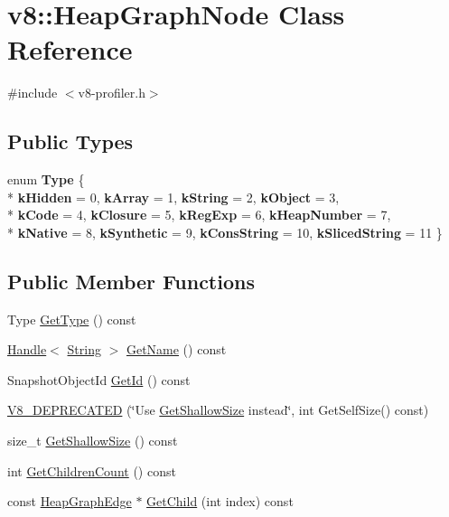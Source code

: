 \hypertarget{classv8_1_1HeapGraphNode}{\section{v8\-:\-:Heap\-Graph\-Node Class Reference}
\label{classv8_1_1HeapGraphNode}
}


{\ttfamily \#include $<$v8-\/profiler.\-h$>$}

\subsection*{Public Types}
\begin{DoxyCompactItemize}
\item 
enum {\bfseries Type} \{ \\*
{\bfseries k\-Hidden} =  0, 
{\bfseries k\-Array} =  1, 
{\bfseries k\-String} =  2, 
{\bfseries k\-Object} =  3, 
\\*
{\bfseries k\-Code} =  4, 
{\bfseries k\-Closure} =  5, 
{\bfseries k\-Reg\-Exp} =  6, 
{\bfseries k\-Heap\-Number} =  7, 
\\*
{\bfseries k\-Native} =  8, 
{\bfseries k\-Synthetic} =  9, 
{\bfseries k\-Cons\-String} =  10, 
{\bfseries k\-Sliced\-String} =  11
 \}
\end{DoxyCompactItemize}
\subsection*{Public Member Functions}
\begin{DoxyCompactItemize}
\item 
Type \hyperlink{classv8_1_1HeapGraphNode_a5e07fc855bded52229e62b855fa08c5d}{Get\-Type} () const 
\item 
\hyperlink{classv8_1_1Handle}{Handle}$<$ \hyperlink{classv8_1_1String}{String} $>$ \hyperlink{classv8_1_1HeapGraphNode_af5f24ee6c07a57814e18bd317cb5576a}{Get\-Name} () const 
\item 
Snapshot\-Object\-Id \hyperlink{classv8_1_1HeapGraphNode_a0faf2a07888af9ca938b3ac089500b4c}{Get\-Id} () const 
\item 
\hyperlink{classv8_1_1HeapGraphNode_af0c5bd1eebaa351d90db71311168729a}{V8\-\_\-\-D\-E\-P\-R\-E\-C\-A\-T\-E\-D} (\char`\"{}Use \hyperlink{classv8_1_1HeapGraphNode_a5f6f1e87efce0b297c3ffad0b50f34d5}{Get\-Shallow\-Size} instead\char`\"{}, int Get\-Self\-Size() const)
\item 
size\-\_\-t \hyperlink{classv8_1_1HeapGraphNode_a5f6f1e87efce0b297c3ffad0b50f34d5}{Get\-Shallow\-Size} () const 
\item 
int \hyperlink{classv8_1_1HeapGraphNode_a0a49abe006755dd5536d15ae42f552d4}{Get\-Children\-Count} () const 
\item 
const \hyperlink{classv8_1_1HeapGraphEdge}{Heap\-Graph\-Edge} $\ast$ \hyperlink{classv8_1_1HeapGraphNode_ac3435611573e58b6614aeaab68442905}{Get\-Child} (int index) const 
\end{DoxyCompactItemize}


